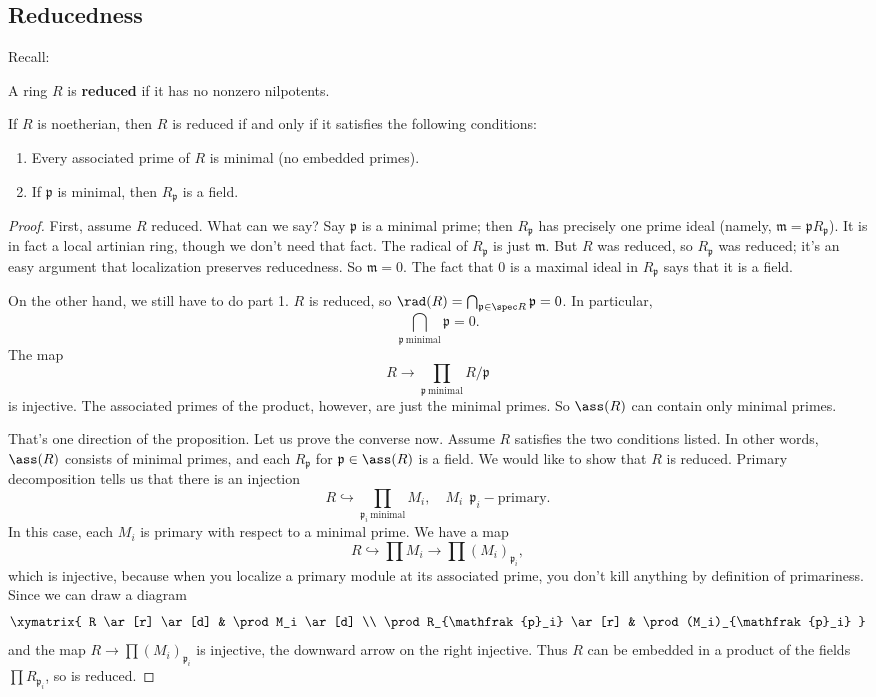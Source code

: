 \subsection{Reducedness}

Recall:

\begin{definition} 
A ring $R$ is \textbf{reduced} if it has no nonzero nilpotents.
\end{definition} 

\begin{proposition} 
If $R$ is noetherian, then $R$ is reduced if and only if it satisfies the
following conditions:
\begin{enumerate}
\item Every associated prime of $R$ is  minimal (no embedded primes).
\item If $\mathfrak{p}$ is minimal, then $R_{\mathfrak{p}}$ is  a field.
\end{enumerate}
\end{proposition}
\begin{proof} 
First, assume $R$ reduced. What can we say? Say $\mathfrak{p}$ is a minimal
prime; then $R_{\mathfrak{p}}$ has precisely one prime ideal (namely,
$\mathfrak{m}=\mathfrak{p}R_{\mathfrak{p}}$). It is in fact a local artinian ring, though we
don't need that fact. The radical of $R_{\mathfrak{p}}$ is just $\mathfrak{m}$.
But $R$ was reduced, so $R_{\mathfrak{p}}$ was reduced; it's an easy argument
that localization preserves reducedness. So $\mathfrak{m}=0$. The fact that 0
is a maximal ideal in $R_{\mathfrak{p}}$ says that it is a field.

On the other hand, we still have to do part 1. $R$ is reduced, so $\rad(R) =
\bigcap_{\mathfrak{p} \in \spec R} \mathfrak{p} = 0$. In particular, 
\[ \bigcap_{\mathfrak{p} \ \mathrm{minimal}}\mathfrak{p} = 0.  \]
The map
\[ R \to \prod_{\mathfrak{p} \ \mathrm{minimal}}R/\mathfrak{p}  \]
is injective. The associated primes of the product, however, are just the
minimal primes. So $\ass(R)$ can contain only minimal primes. 

That's one direction of the proposition. Let us prove the converse now. Assume
$R$ satisfies the two conditions listed. In other words, $\ass(R)$ consists of
minimal primes, and each $R_{\mathfrak{p}}$ for $\mathfrak{p} \in \ass(R)$ is a
field. We would like to show that $R$ is reduced. 
Primary decomposition tells us that there is an injection 
\[ R \hookrightarrow \prod_{\mathfrak{p}_i \ \mathrm{minimal}} M_i, \quad M_i
\ \  \mathfrak{p}_i-\mathrm{primary}. \]
In this case, each $M_i$ is primary with respect to a minimal prime. We have a
map
\[ R \hookrightarrow \prod M_i \to \prod (M_i)_{\mathfrak{p}_i},  \]
which is injective, because when you localize a primary module at its
associated prime, you don't kill anything by definition of primariness. Since
we can draw a diagram
\[ 
\xymatrix{
R \ar[r] \ar[d]  &  \prod M_i \ar[d]  \\
\prod R_{\mathfrak{p}_i} \ar[r] & \prod (M_i)_{\mathfrak{p}_i}
}
\]
and the map $R \to \prod (M_i)_{\mathfrak{p}_i}$ is injective, the downward
arrow on the right injective. Thus $R$ can be embedded in
a product of the fields $\prod R_{\mathfrak{p}_i}$, so is reduced.
\end{proof} 
